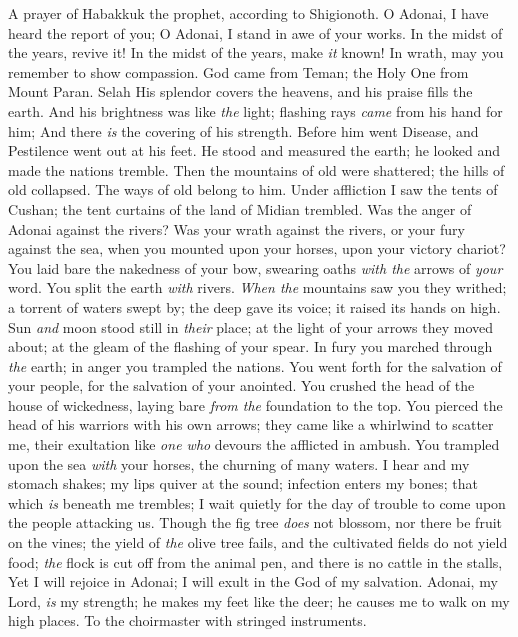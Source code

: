 \begin{biblechapter} %
 A prayer of Habakkuk the prophet, according to Shigionoth.
\verse O Adonai, I have heard the report of you; 
O Adonai, I stand in awe of your works. 
In the midst of the years, revive it! 
In the midst of the years, make \textit{it} known! 
In wrath, may you remember to show compassion.
\verse God came from Teman; 
the Holy One from Mount Paran. Selah 
His splendor covers the heavens, 
and his praise fills the earth.
\verse And his brightness was like \textit{the} light; 
flashing rays \textit{came} from his hand for him; 
And there \textit{is} the covering of his strength.
\verse Before him went Disease, 
and Pestilence went out at his feet.
\verse He stood and measured the earth; 
he looked and made the nations tremble. 
Then the mountains of old were shattered; 
the hills of old collapsed. 
The ways of old belong to him.
\verse Under affliction I saw the tents of Cushan; 
the tent curtains of the land of Midian trembled.
\verse Was the anger of Adonai against the rivers? 
Was your wrath against the rivers, 
or your fury against the sea, 
when you mounted upon your horses, 
upon your victory chariot?
\verse You laid bare the nakedness of your bow, 
swearing oaths \textit{with the} arrows of \textit{your} word. 
You split the earth \textit{with} rivers.
\verse \textit{When the} mountains saw you they writhed; 
a torrent of waters swept by; 
the deep gave its voice; 
it raised its hands on high.
\verse Sun \textit{and} moon stood still in \textit{their} place; 
at the light of your arrows they moved about; 
at the gleam of the flashing of your spear.
\verse In fury you marched through \textit{the} earth; 
in anger you trampled the nations.
\verse You went forth for the salvation of your people, 
for the salvation of your anointed. 
You crushed the head of the house of wickedness, 
laying bare \textit{from the} foundation to the top.
\verse You pierced the head of his warriors with his own arrows; 
they came like a whirlwind to scatter me, 
their exultation like \textit{one who} devours the afflicted in ambush.
\verse You trampled upon the sea \textit{with} your horses, 
the churning of many waters.
\verse I hear and my stomach shakes; 
my lips quiver at the sound; 
infection enters my bones; 
that which \textit{is} beneath me trembles; 
I wait quietly for the day of trouble 
to come upon the people attacking us.
\verse Though the fig tree \textit{does} not blossom, 
nor there be fruit on the vines; 
the yield of \textit{the} olive tree fails, 
and the cultivated fields do not yield food; 
\textit{the} flock is cut off from the animal pen, 
and there is no cattle in the stalls,
\verse Yet I will rejoice in Adonai; 
I will exult in the God of my salvation.
\verse Adonai, my Lord, \textit{is} my strength; 
he makes my feet like the deer; 
he causes me to walk on my high places. 
To the choirmaster with stringed instruments.
\end{biblechapter}

